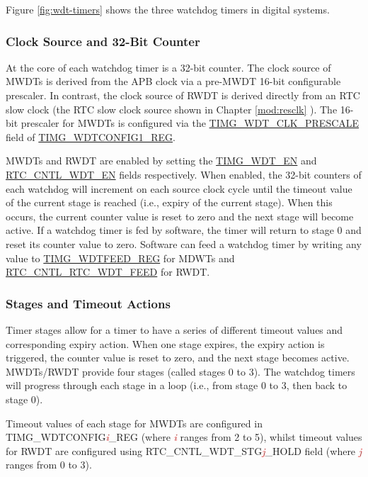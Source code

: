 \documentclass[main\_\_EN.tex]{subfiles}
\begin{document}
Figure \ref{fig:wdt-timers} shows the three watchdog timers in \chipname{} digital systems.

\subsubsection{Clock Source and 32-Bit Counter}


At the core of each watchdog timer is a 32-bit counter. The clock source of MWDTs is derived from the APB clock via a pre-MWDT 16-bit configurable prescaler. In contrast, the clock source of RWDT is derived directly from an RTC slow clock (the RTC slow clock source shown in Chapter \ref{mod:resclk} \textit{}). The 16-bit prescaler for MWDTs is configured via the \hyperref[fielddesc:TIMGWDTCLKPRESCALE]{TIMG\_WDT\_CLK\_PRESCALE} field of \hyperref[regdesc:TIMGWDTCONFIG1REG]{TIMG\_WDTCONFIG1\_REG}.


MWDTs and RWDT are enabled by setting the \hyperref[fielddesc:TIMGWDTEN]{TIMG\_WDT\_EN} and \hyperref[fielddesc:RTCCNTLWDTEN]{RTC\_CNTL\_WDT\_EN} fields respectively. When enabled, the 32-bit counters of each watchdog will increment on each source clock cycle until the timeout value of the current stage is reached (i.e., expiry of the current stage). When this occurs, the current counter value is reset to zero and the next stage will become active. If a watchdog timer is fed by software, the timer will return to stage 0 and reset its counter value to zero. Software can feed a watchdog timer by writing any value to \hyperref[regdesc:TIMGWDTFEEDREG]{TIMG\_WDTFEED\_REG} for MDWTs and \hyperref[fielddesc:RTCCNTLRTCWDTFEED]{RTC\_CNTL\_RTC\_WDT\_FEED} for RWDT.


\subsubsection{Stages and Timeout Actions}\label{sec:wdt-timeout}
Timer stages allow for a timer to have a series of different timeout values and corresponding expiry action. When one stage expires, the expiry action is triggered, the counter value is reset to zero, and the next stage becomes active. MWDTs/RWDT provide four stages (called stages 0 to 3). The watchdog timers will progress through each stage in a loop (i.e., from stage 0 to 3, then back to stage 0).

Timeout values of each stage for MWDTs are configured in TIMG\_WDTCONFIG\textcolor{red}{\it{i}}\_REG (where \textcolor{red}{\it{i}} ranges from 2 to 5), whilst timeout values for RWDT are configured using RTC\_CNTL\_WDT\_STG\textcolor{red}{\it{j}}\_HOLD field (where \textcolor{red}{\it{j}} ranges from 0 to 3).
\end{document}

